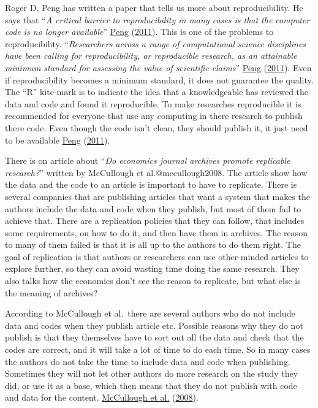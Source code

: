 \documentclass[
  12pt,
]{article}
\begin{document}
Roger D. Peng has written a paper that tells us more about
reproducibility. He says that ``\emph{A critical barrier to
reproducibility in many cases is that the computer code is no longer
available}'' \protect\hyperlink{ref-peng2011}{Peng}
(\protect\hyperlink{ref-peng2011}{2011}). This is one of the problems to
reproducibility. ``\emph{Researchers across a range of computational
science disciplines have been calling for reproducibility, or
reproducible research, as an attainable minimum standard for assessing
the value of scientific claims}'' \protect\hyperlink{ref-peng2011}{Peng}
(\protect\hyperlink{ref-peng2011}{2011}). Even if reproducibility
becomes a minimum standard, it does not guarantee the quality. The ``R''
kite-mark is to indicate the idea that a knowledgeable has reviewed the
data and code and found it reproducible. To make researches reproducible
it is recommended for everyone that use any computing in there research
to publish there code. Even though the code isn't clean, they should
publish it, it just need to be available
\protect\hyperlink{ref-peng2011}{Peng}
(\protect\hyperlink{ref-peng2011}{2011}).

There is on article about ``\emph{Do economics journal archives promote
replicable research?}'' written by McCullough et al.@mccullough2008. The
article show how the data and the code to an article is important to
have to replicate. There is several companies that are publishing
articles that want a system that makes the authors include the data and
code when they publish, but most of them fail to achieve that. There are
a replication policies that they can follow, that includes some
requirements, on how to do it, and then have them in archives. The
reason to many of them failed is that it is all up to the authors to do
them right. The goal of replication is that authors or researchers can
use other-minded articles to explore further, so they can avoid wasting
time doing the same research. They also talks how the economics don't
see the reason to replicate, but what else is the meaning of archives?

According to McCullough et al.~there are several authors who do not
include data and codes when they publish article etc. Possible reasons
why they do not publish is that they themselves have to sort out all the
data and check that the codes are correct, and it will take a lot of
time to do each time. So in many cases the authors do not take the time
to include data and code when publishing. Sometimes they will not let
other authors do more research on the study they did, or use it as a
base, which then means that they do not publish with code and data for
the content. \protect\hyperlink{ref-mccullough2008}{McCullough et al.}
(\protect\hyperlink{ref-mccullough2008}{2008}).
\end{document}
